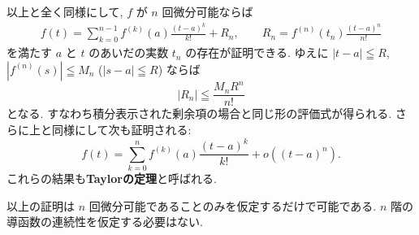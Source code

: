 \documentclass[12pt,twoside]{jarticle}
\theoremstyle{jplain}
\theoremstyle{jplain}
\theoremstyle{jplain}
\numberwithin{theorem}{section}
\numberwithin{equation}{section}
\numberwithin{figure}{section}
\numberwithin{table}{section}
\begin{document}
以上と全く同様にして, $f$ が $n$ 回微分可能ならば
\begin{align*}
f(t)=
\sum_{k=0}^{n-1} f^{(k)}(a)\frac{(t-a)^k}{k!}
+R_n,
\qquad
R_n = f^{(n)}(t_n)\frac{(t-a)^n}{n!}
\end{align*}
を満たす $a$ と $t$ のあいだの実数 $t_n$ の存在が証明できる.
ゆえに $|t-a|\leqq R$, $|f^{(n)}(s)|\leqq M_n$ ($|s-a|\leqq R$) ならば
\[
|R_n| \leqq \frac{M_n R^n}{n!}
\]
となる. すなわち積分表示された剰余項の場合と同じ形の評価式が得られる.
さらに上と同様にして次も証明される:
\[
f(t) = \sum_{k=0}^n f^{(k)}(a)\frac{(t-a)^k}{k!} + o((t-a)^n).
\]
これらの結果も{\bfseries Taylorの定理}と呼ばれる.

以上の証明は $n$ 回微分可能であることのみを仮定するだけで可能である.
$n$ 階の導函数の連続性を仮定する必要はない.

\end{document}
